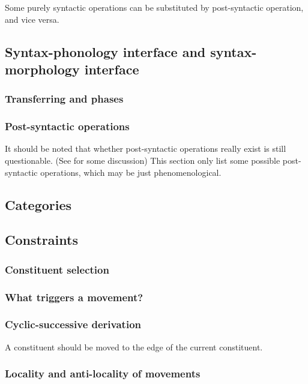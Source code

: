 \documentclass[a4paper]{article}
\begin{document}
Some purely syntactic operations can be substituted by post-syntactic operation, and vice versa.

\subsection{Syntax-phonology interface and syntax-morphology interface}

\subsubsection{Transferring and phases}

\subsubsection{Post-syntactic operations}

It should be noted that whether post-syntactic operations really exist is still questionable. (See  for some discussion)
This section only list some possible post-syntactic operations, which may be just phenomenological.

\subsection{Categories}

\subsection{Constraints}

\subsubsection{Constituent selection}

\subsubsection{What triggers a movement?}

\subsubsection{Cyclic-successive derivation}

A constituent should be moved to the edge of the current constituent.

\subsubsection{Locality and anti-locality of movements}
\end{document}
